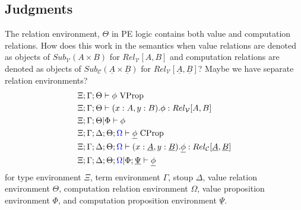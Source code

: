 \documentclass{article}
\begin{document}
\subsection{Judgments}
\begin{comment}
    
    Q:
    relation contexts contain value and computation contexts?
    how then are value vs computation propositions indexed?
    \\
    value formation rules involve 
    
    \begin{itemize}
        \item type context
        \item term context
        \item value relation context?
    \end{itemize}

    computation formation rules involve 
\begin{itemize}
    \item type context
    \item term context
    \item stoup
    \item value relation context?
    \item computation relation context?
    \item 
\end{itemize}
\end{comment}
The relation environment, $\Theta$ in PE logic contains both value and computation relations. 
How does this work in the semantics when value relations are denoted as objects of $Sub_{\mathcal{V}}(A \times B)$ for $Rel_{\mathcal{V}}[A,B]$
and computation relations are denoted as objects of $Sub_{\mathcal{C}}(\underline{A} \times \underline{B})$ for $Rel_{\mathcal{V}}[\underline{A},\underline{B}]$?
Maybe we have separate relation environments?
\begin{align*}
    &\Xi ; \Gamma ; \Theta \vdash \phi \textrm{ VProp}  \\
    &\Xi ; \Gamma ; \Theta \vdash (x : A , y : B). \phi : Rel_{\mathcal{V}}[A,B]\\
    &\Xi ; \Gamma ; \Theta | \Phi \vdash \phi\\
    &\Xi ; \Gamma ; \Delta ; \Theta ; \textcolor{blue}{\Omega} \vdash \underline{\phi} \textrm{ CProp}  \\
    &\Xi ; \Gamma ; \Delta ; \Theta ; \textcolor{blue}{\Omega} \vdash (x : \underline{A}, y : \underline{B}). \underline{\phi} : Rel_{\mathcal{C}}[\underline{A},\underline{B}]  \\
    &\Xi ; \Gamma ; \Delta ; \Theta ; \textcolor{blue}{\Omega} | \Phi ; \underline{\Psi} \vdash \underline{\phi} \\
\end{align*}
for type environment $\Xi$, term environment $\Gamma$, stoup $\Delta$, value relation environment $\Theta$,
computation relation environment $\Omega$, value proposition environment $\Phi$, and computation proposition environment $\underline{\Psi}$.
\end{document}
